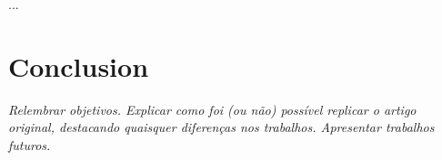     ...


\section{Conclusion}


  \textit{Relembrar objetivos.
  Explicar como foi (ou não) possível replicar o artigo original, destacando quaisquer diferenças nos trabalhos.
  Apresentar trabalhos futuros.}

